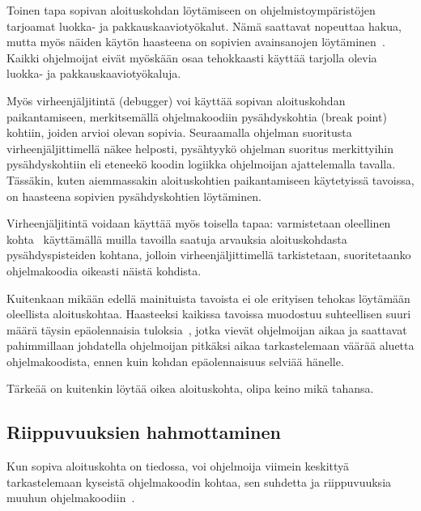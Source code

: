 \documentclass[finnish]{tktltiki2}
\theoremstyle{definition}
\theoremstyle{remark}
\begin{document}
Toinen tapa sopivan aloituskohdan löytämiseen on ohjelmistoympäristöjen tarjoamat luokka- ja pakkauskaaviotyökalut. Nämä saattavat nopeuttaa hakua, mutta myös näiden käytön haasteena on sopivien avainsanojen löytäminen~\cite{what-to-search-for}. Kaikki ohjelmoijat eivät myöskään osaa tehokkaasti käyttää tarjolla olevia luokka- ja pakkauskaaviotyökaluja.

Myös virheenjäljitintä (debugger) voi käyttää sopivan aloituskohdan paikantamiseen, merkitsemällä ohjelmakoodiin pysähdyskohtia (break point) kohtiin, joiden arvioi olevan sopivia.
Seuraamalla ohjelman suoritusta virheenjäljittimellä näkee helposti, pysähtyykö ohjelman suoritus merkittyihin pysähdyskohtiin eli eteneekö koodin logiikka ohjelmoijan ajattelemalla tavalla.
Tässäkin, kuten aiemmassakin aloituskohtien paikantamiseen käytetyissä tavoissa, on haasteena sopivien pysähdyskohtien löytäminen.

Virheenjäljitintä voidaan käyttää myös toisella tapaa: varmistetaan oleellinen kohta~\cite{eliciting-design-requirements-for-maintenance-oriented-ides} käyttämällä muilla tavoilla saatuja arvauksia aloituskohdasta pysähdyspisteiden kohtana, jolloin virheenjäljittimellä tarkistetaan, suoritetaanko ohjelmakoodia oikeasti näistä kohdista.

Kuitenkaan mikään edellä mainituista tavoista ei ole erityisen tehokas löytämään oleellista aloituskohtaa. Haasteeksi kaikissa tavoissa muodostuu suhteellisen suuri määrä täysin epäolennaisia tuloksia~\cite{eliciting-design-requirements-for-maintenance-oriented-ides}, jotka vievät ohjelmoijan aikaa ja saattavat pahimmillaan johdatella ohjelmoijan pitkäksi aikaa tarkastelemaan väärää aluetta ohjelmakoodista, ennen kuin kohdan epäolennaisuus selviää hänelle.

Tärkeää on kuitenkin löytää oikea aloituskohta, olipa keino mikä tahansa.

\subsection{Riippuvuuksien hahmottaminen}
Kun sopiva aloituskohta on tiedossa, voi ohjelmoija viimein keskittyä tarkastelemaan kyseistä ohjelmakoodin kohtaa, sen suhdetta ja riippuvuuksia muuhun ohjelmakoodiin~\cite{questions-during-software-evolution-tasks}.
\end{document}

